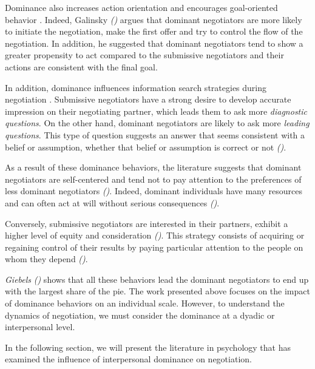 \documentclass[10pt, a4paper, twocolumn]{article} %
\begin{document}
			Dominance also increases action orientation and encourages goal-oriented behavior \cite{van2006power}. Indeed, Galinsky  \emph{(\cite{Galinsky2003power})} argues that dominant negotiators are more likely to initiate the negotiation, make the first offer and try to control the flow of the negotiation. 
			In addition, he suggested that dominant negotiators tend to show a greater propensity to act compared to the submissive negotiators and their actions are consistent with the final goal.
			
			In addition, dominance influences information search strategies during negotiation \cite{de2004influence}. Submissive negotiators have a strong desire to develop accurate impression on their negotiating partner, which leads them to ask more \emph{diagnostic questions}.
			On the other hand, dominant negotiators are likely to ask more \emph{leading questions}. This type of question suggests an answer that seems consistent with a belief or assumption, whether that belief or assumption is correct or not \emph{(\cite{Galinsky2003power})}.
			
			As a result of these dominance behaviors, the literature suggests that dominant negotiators are self-centered and tend not to pay attention to the preferences of less dominant negotiators \emph{(\cite{fiske1993controlling, de1995impact})}. Indeed, dominant individuals have many resources and can often act at will without serious consequences \emph{(\cite{van2006power})}. 
			
			Conversely, submissive negotiators are interested in their partners, exhibit a higher level of equity and consideration \emph{(\cite{de1995impact})}. This strategy consists of acquiring or regaining control of their results by paying particular attention to the people on whom they depend \emph{(\cite{fiske1993controlling})}.
			
			\emph{Giebels} \emph{(\cite{giebels2000interdependence})} shows that all these behaviors lead the dominant negotiators to end up with the largest share of the pie.
			The work presented above focuses on the impact of dominance behaviors on an individual scale. However, to understand the dynamics of negotiation, we must consider the dominance at a dyadic or interpersonal level. 
			
			In the following section, we will present the literature in psychology that has examined the influence of interpersonal dominance on negotiation. 
\end{document}
